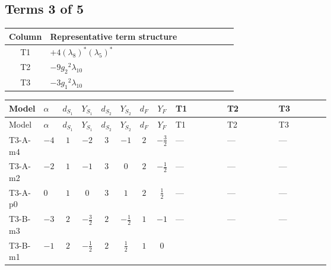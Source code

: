 \documentclass[8pt]{article}
\begin{document}
\begin{landscape}
\subsection*{Terms 3 of 5}
\begin{center}
\begin{tabular}{@{}c >{\raggedright\arraybackslash}p{0.82\linewidth}@{}}
\toprule
Column & Representative term structure \\
\midrule
T1 & \(\displaystyle +4 \left({\lambda_{8}}\right)^{*} \left({\lambda_5}\right)^{*}\) \\
\midrule
T2 & \(\displaystyle -9 {g_2}^2 {\lambda_{10}}\) \\
\midrule
T3 & \(\displaystyle -3 {g_1}^2 {\lambda_{10}}\) \\
\midrule
\bottomrule
\end{tabular}
\end{center}
\smallskip
\tiny
\begin{longtable}{@{}llcccccc >{\raggedright\arraybackslash}p{0.21\linewidth} >{\raggedright\arraybackslash}p{0.21\linewidth} >{\raggedright\arraybackslash}p{0.21\linewidth}@{}}
\toprule
Model & $\alpha$ & $d_{S_1}$ & $Y_{S_1}$ & $d_{S_2}$ & $Y_{S_2}$ & $d_F$ & $Y_F$ & T1 & T2 & T3 \\
\midrule
\endfirsthead
\toprule
Model & $\alpha$ & $d_{S_1}$ & $Y_{S_1}$ & $d_{S_2}$ & $Y_{S_2}$ & $d_F$ & $Y_F$ & T1 & T2 & T3 \\
\midrule
\endhead
T3-A-m4 & $-4$ & $1$ & $-2$ & $3$ & $-1$ & $2$ & $-\frac{3}{2}$ & --- & --- & --- \\
\midrule
T3-A-m2 & $-2$ & $1$ & $-1$ & $3$ & $0$ & $2$ & $-\frac{1}{2}$ & --- & --- & --- \\
\midrule
T3-A-p0 & $0$ & $1$ & $0$ & $3$ & $1$ & $2$ & $\frac{1}{2}$ & --- & --- & --- \\
\midrule
T3-B-m3 & $-3$ & $2$ & $-\frac{3}{2}$ & $2$ & $-\frac{1}{2}$ & $1$ & $-1$ & --- & --- & --- \\
\midrule
T3-B-m1 & $-1$ & $2$ & $-\frac{1}{2}$ & $2$ & $\frac{1}{2}$ & $1$ & $0$ & \scriptsize\adjustbox{max width=\linewidth}{$\begin{gathered} +4 \left({\lambda_{8}}\right)^{*} \left({\lambda_5}\right)^{*}\end{gathered}$} & \scriptsize\adjustbox{max width=\linewidth}{$\begin{gathered} -9 {g_2}^2 {\lambda_{10}}\end{gathered}$} & \scriptsize\adjustbox{max width=\linewidth}{$\begin{gathered} -3 {g_1}^2 {\lambda_{10}}\end{gathered}$} \\

\end{longtable}
\end{landscape}
\end{document}
